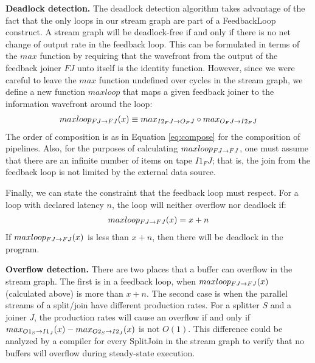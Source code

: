 {\bf Deadlock detection.}  The deadlock detection algorithm takes
advantage of the fact that the only loops in our stream graph are part
of a FeedbackLoop construct.  A stream graph will be deadlock-free if
and only if there is no net change of output rate in the feedback
loop.  This can be formulated in terms of the $max$ function by
requiring that the wavefront from the output of the feedback joiner
$FJ$ unto itself is the identity function.  However, since we were
careful to leave the $max$ function undefined over cycles in the
stream graph, we define a new function $maxloop$ that maps a given
feedback joiner to the information wavefront around the loop:
\begin{eqnarray*}
maxloop_{FJ \rightarrow FJ}(x) \equiv max_{I2_FJ \rightarrow O_FJ} \circ max_{O_FJ \rightarrow I2_FJ}
\end{eqnarray*}
The order of composition is as in Equation \ref{eq:compose} for the
composition of pipelines. Also, for the purposes of calculating
$maxloop_{FJ \rightarrow FJ}$, one must assume that there are an infinite number of items
on tape $I1_FJ$; that is, the join from the feedback loop is not
limited by the external data source.  

Finally, we can state the constraint that the feedback loop must
respect.  For a loop with declared latency $n$, the loop will neither
overflow nor deadlock if:
\begin{eqnarray*}
maxloop_{FJ \rightarrow FJ}(x) = x + n
\end{eqnarray*}
If $maxloop_{FJ \rightarrow FJ}(x)$ is less than $x + n$, then there will be deadlock in
the program.

{\bf Overflow detection.}  There are two places that a buffer can
overflow in the stream graph.  The first is in a feedback loop, when
$maxloop_{FJ \rightarrow FJ}(x)$ (calculated above) is more than $x + n$.  The second
case is when the parallel streams of a split/join have different
production rates.  For a splitter $S$ and a joiner $J$, the production
rates will cause an overflow if and only if $max_{O1_S \rightarrow I1_J}(x) -
max_{O2_S \rightarrow I2_J}(x)$ is not $O(1)$.  This difference could be analyzed
by a compiler for every SplitJoin in the stream graph to verify that
no buffers will overflow during steady-state execution.



